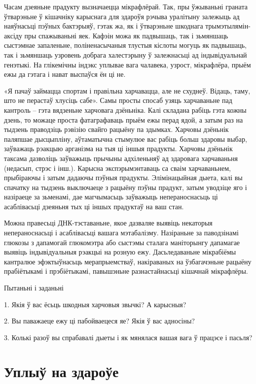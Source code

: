 Часам дзеяньне прадукту вызначаецца мікрафлёрай. Так, пры ўжываньні граната ўтварэньне ў кішачніку карыснага для здароўя рэчыва уралітыну залежыць ад наяўнасьці пэўных бактэрыяў, гэтак жа, як і ўтварэньне шкоднага трымэтылямін-аксіду пры спажываньні яек. Кафэін можа як падвышаць, так і зьмяншаць сыстэмнае запаленьне, поліненасычаныя тлустыя кіслоты могуць як падвышаць, так і зьмяншаць узровень добрага халестэрыну ў залежнасьці ад індывідуальнай генэтыкі. На глікемічны індэкс уплывае вага чалавека, узрост, мікрафлёра, прыём ежы да гэтага і нават выспаўся ён ці не.

«Я пачаў займацца спортам і правільна харчавацца, але не схуднеў. Відаць, таму, што не перастаў хлусіць сабе». Самы просты спосаб узяць харчаваньне пад кантроль – гэта вядзеньне харчовага дзёньніка. Калі складана рабіць гэта кожны дзень, то можаце проста фатаграфаваць прыём ежы перад ядой, а затым раз на тыдзень праводзіць рэвізію свайго рацыёну па здымках. Харчовы дзёньнік паляпшае дысцыпліну, аўтаматычна стымулюе вас рабіць больш здаровы выбар, заўважаць рэакцыю арганізма на тыя ці іншыя прадукты. Харчовы дзёньнік таксама дазволіць заўважыць прычыны адхіленьняў ад здаровага харчаваньня (недасып, стрэс і інш.). Карысна экспэрымэнтаваць са сваім харчаваньнем, прыбіраючы і затым дадаючы пэўныя прадукты. Элімінацыйная дыета, калі вы спачатку на тыдзень выключаеце з рацыёну пэўны прадукт, затым уводзіце яго і назіраеце за зьменамі, дае магчымасьць заўважыць непераноснасьць ці асаблівасьці дзеяньня тых ці іншых прадуктаў на ваш стан.

Можна правесьці ДНК-тэставаньне, якое дазваляе выявіць некаторыя непераноснасьці і асаблівасьці вашага мэтабалізму. Назіраньне за паводзінамі глюкозы з дапамогай глюкомэтра або сыстэмы сталага маніторынгу дапамагае выявіць індывідуальныя рэакцыі на розную ежу. Дасьледаваньне мікрабіёмы кантралюе эфэктыўнасьць мерапрыемстваў, накіраваных на ўзбагачэньне рацыёну прабіётыкамі і прэбіётыкамі, павышэньне разнастайнасьці кішачнай мікрафлёры.

Пытаньні і заданьні

1. Якія ў вас ёсьць шкодныя харчовыя звычкі? А карысныя?

2. Вы паважаеце ежу ці пабойваецеся яе? Якія ў вас адносіны?

3. Колькі разоў вы спрабавалі дыеты і як мянялася вашая вага ў працэсе і пасьля?


\section{Уплыў на здароўе}

